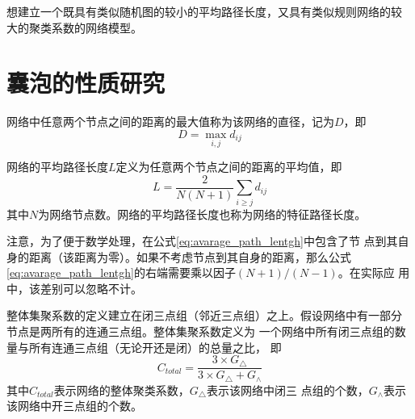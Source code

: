 \documentclass[bachelor,winfonts]{jnuthesis} %
\begin{document}
    想建立一个既具有类似随机图的较小的平均路径长度，又具有类似规则网络的较
    大的聚类系数的网络模型。
    
    \section{囊泡的性质研究}
    
    \begin{definition}[直径]
        网络中任意两个节点之间的距离的最大值称为该网络的直径，记为$D$，即
        \begin{equation}\label{eq:dimension}
        D = \max_{i,j} d_{ij}
        \end{equation}
    \end{definition}
       
    \begin{definition}[平均路径长度]
        网络的平均路径长度$L$定义为任意两个节点之间的距离的平均值，即
        \begin{equation}\label{eq:avarage_path_lentgh}
        L = \frac{2}{N(N+1)}\sum_{i\geq j}d_{ij}
        \end{equation}
        其中$N$为网络节点数。网络的平均路径长度也称为网络的特征路径长度。
    \end{definition}
    
    注意，为了便于数学处理，在公式\eqref{eq:avarage_path_lentgh}中包含了节
    点到其自身的距离（该距离为零）。如果不考虑节点到其自身的距离，那么公式
    \eqref{eq:avarage_path_lentgh}的右端需要乘以因子$(N+1)/(N-1)$。在实际应
    用中，该差别可以忽略不计。
    
    \begin{definition}[整体聚类系数]
        整体集聚系数的定义建立在闭三点组（邻近三点组）之上。假设网络中有一部分
        节点是两所有的连通三点组。整体集聚系数定义为
        一个网络中所有闭三点组的数量与所有连通三点组（无论开还是闭）的总量之比，
        即
        \[
        C_{total}=\frac{3\times G_{\triangle}}{3 \times G_{\triangle} + G_{\wedge}}
        \]
        其中$C_{total}$表示网络的整体聚类系数，$G_{\triangle}$表示该网络中闭三
        点组的个数，$G_{\wedge}$表示该网络中开三点组的个数\cite{luce1949method}。
    \end{definition}
    
\end{document}
